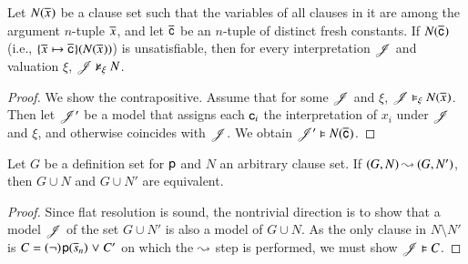 \newcommand{\mm}{\ourmodel}
\newcommand{\notmodels}{\nvDash}
\begin{rep}
   \begin{lemma}
   \label{lem:unsat-fresh-consts}
   Let $N(\overline{x}_{})$ be a clause set such that the variables of all
   clauses in it are among the argument $n$-tuple $\overline{x}_{}$, and let
   $\overline{\mathsf{c}}_{}$ be an $n$-tuple of distinct fresh constants. If
   $N(\overline{\mathsf{c}}_{})$ {\upshape(}i.e.,
   $\{\overline{x}_{}\mapsto\overline{\mathsf{c}}_{}\}(N(\overline{x}_{}))${\upshape)} is
   unsatisfiable, then for every interpretation $\mm$ and valuation $\xi$,
   $\mm \notmodels_\xi N$.
   \end{lemma}
   \begin{proof}
      We show the contrapositive. Assume that for some $\mm$ and $\xi$,  $\mm \models_\xi N(\tupleempty{x})$.
      Then let $\mathscr{J}'$
      be a model that assigns each $\mathsf{c}_i$ the interpretation of $x_i$ under $\mm$ and $\xi$, and otherwise
      coincides with $\mathscr{J}$. We obtain $\mathscr{J}' \vDash N(\overline{\mathsf{c}}_{})$.
   \end{proof}

   \begin{lemma}
      \label{lem:flat-res-set-step-satisfiability}
      Let $G$ be a definition set for $\mathsf{p}$\confrep{,}{} and $N$ an arbitrary clause
      set. If $(G, N) \mathbin\leadsto (G, N')$, then $G \cup N$ and $G \cup N'$ are
      equivalent.
   \end{lemma}
   \begin{proof}
      Since flat resolution is sound, the nontrivial direction is to show that a
      model $\mm$ of the set $G \cup N'$ is also a model of $G \cup N$. As the only clause in $N
      \setminus N'$ is $C = (\neg)\kern.2ex{\mathsf{p}(\overline{s}_{n})} \mathrel{\lor} C'$ on which
      the $\mathbin\leadsto$ step is performed, we must show $\mm \models C$.



\end{proof}
\end{rep}
